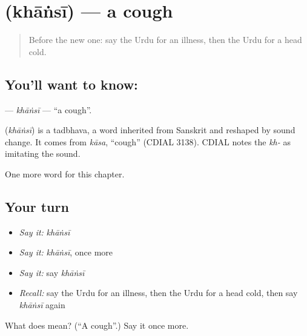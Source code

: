 \section[\texorpdfstring{\ur{کھانسی} (khāṅsī)}{کھانسی (khāṅsī)}]{ (khāṅsī) — a cough}

\label{lesson:UR-C152-khansi}



\begin{quote}
Before the new one: say the Urdu for an illness, then the Urdu for a head cold.
\end{quote}

\subsection*{You'll want to know: }
\textbf{} — \emph{khāṅsī} — \textquotedblleft{}a cough\textquotedblright{}.

\begin{cousinweb}
\textbf{} (\emph{khāṅsī}) is a tadbhava, a word inherited from Sanskrit and reshaped by sound change. It comes from \emph{kāsa}, \textquotedblleft{}cough\textquotedblright{} (CDIAL 3138). CDIAL notes the \emph{kh-} as imitating the sound.
\end{cousinweb}

\begin{grammarlens}[title={What you've built}]
One more word for this chapter.
\end{grammarlens}

\subsection*{Your turn}
\begin{itemize}
\raggedright
  \item \emph{Say it:} \emph{khāṅsī}
  \item \emph{Say it:} \emph{khāṅsī}, once more
  \item \emph{Say it:} say \emph{khāṅsī}
  \item \emph{Recall:} say the Urdu for an illness, then the Urdu for a head cold, then say \emph{khāṅsī} again
\end{itemize}

\begin{tcolorbox}[breakable,colback=teal!4,colframe=teal!35!black,title={Before you move on}]
What does  mean? (\textquotedblleft{}A cough\textquotedblright{}.) Say it once more.
\end{tcolorbox}
